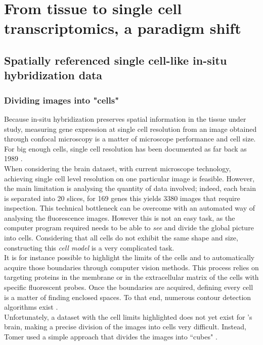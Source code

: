 \chapter{From tissue to single cell transcriptomics, a paradigm shift}\label{ch:singlecell}
\section{Spatially referenced single cell-like in-situ hybridization data}\label{sec:single_cell_insitu}
  \subsection{Dividing images into "cells"}
  Because in-situ hybridization preserves spatial information in the tissue under study, measuring gene expression at single cell resolution from an image obtained through confocal microscopy is a matter of microscope performance and cell size. For big enough cells, single cell resolution has been documented as far back as 1989 \cite{tautz89,poulsen93}.\\
  
  When considering the \platy{} brain dataset, with current microscope technology, achieving single cell level resolution on one particular image is feasible. However, the main limitation is analysing the quantity of data involved; indeed, each brain is separated into 20 slices, for 169 genes this yields 3380 images that require inspection. This technical bottleneck can be overcome with an automated way of analysing the fluorescence images. However this is not an easy task, as the computer program required needs to be able to \emph{see} and divide the global picture into cells. Considering that all cells do not exhibit the same shape and size, constructing this \emph{cell model} is a very complicated task.\\
  
  It is for instance possible to highlight the limits of the cells and to automatically acquire those boundaries through computer vision methods. This process relies on targeting proteins in the membrane or in the extracellular matrix of the cells with specific fluorescent probes. Once the boundaries are acquired, defining every cell is a matter of finding enclosed spaces. To that end, numerous contour detection algorithms exist \cite{li95,fan01,arbelaez11}.\\
  
  Unfortunately, a dataset with the cell limits highlighted does not yet exist for \platy{}'s brain, making a precise division of the images into cells very difficult. Instead, Tomer used a simple approach that divides the images into ``cubes" \cite{Tomer10}.


